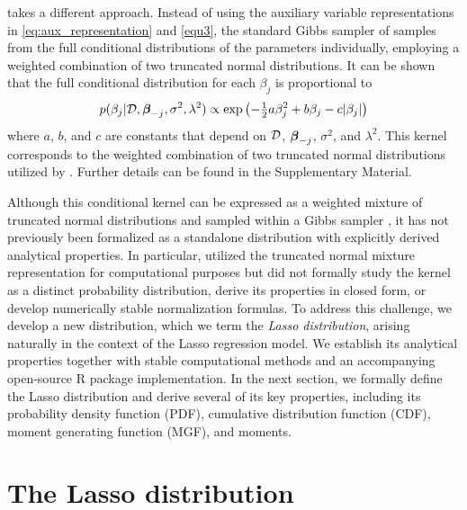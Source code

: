 \citet{hans2009bayesian} takes a different approach. Instead of using the auxiliary variable representations in \eqref{eq:aux_representation} and \eqref{equ3}, the standard Gibbs sampler of \citet{hans2009bayesian} samples from the full conditional distributions of the parameters individually, employing a weighted combination of two truncated normal distributions. It can be shown that the full conditional distribution for each $\beta_j$ is proportional to 
\begin{align}\label{LassoProp}
p(\beta_j|{\mathcal D},{\boldsymbol \beta}_{-j},\sigma^2,\lambda^2) \propto 
\exp\left(-\tfrac{1}{2}a\beta_j^2 + b\beta_j - c |\beta_j|\right)
\end{align}
where $a$, $b$, and $c$ 
are constants that
depend on ${\mathcal D}$, ${\boldsymbol \beta}_{-j}$, $\sigma^2$, and $\lambda^2$. 
This kernel corresponds to the weighted combination of two truncated normal distributions utilized by \citet{hans2009bayesian}. Further details can be found in the Supplementary Material.


Although this conditional kernel can be expressed as a weighted mixture of truncated normal distributions and sampled within a Gibbs sampler \citep{hans2009bayesian}, it has not previously been formalized as a standalone distribution with explicitly derived analytical properties. In particular, \citet{hans2009bayesian} utilized the truncated normal mixture representation for computational purposes but did not formally study the kernel as a distinct probability distribution, derive its properties in closed form, or develop numerically stable normalization formulas. To address this challenge, we develop a new distribution, which we term the {\em Lasso distribution}, arising naturally in the context of the Lasso regression model. We establish its analytical properties together with stable computational methods and an accompanying open-source R package implementation. In the next section, we formally define the Lasso distribution and derive several of its key properties, including its probability density function (PDF), cumulative distribution function (CDF), moment generating function (MGF), and moments.




\section{The Lasso distribution}\label{Sec:LassoDistribution}

